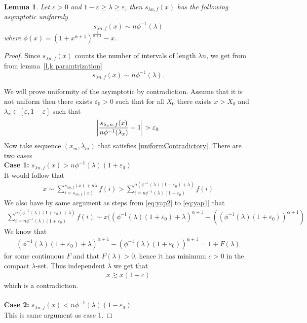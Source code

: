 \documentclass[10pt]{article}
\theoremstyle{plain}
\newtheorem{lemma}{Lemma}
\theoremstyle{definition}
\let\epsilon\varepsilon
\begin{document}
	\begin{lemma}\label{s asymp}
		Let $\epsilon>0$ and $1-\epsilon\geq\lambda\geq\epsilon$, then $s_{\lambda n, f}(x)$ has the following asymptotic uniformly
		\begin{equation}
			s_{\lambda n, f}(x)\sim n\phi^{-1}\left(\lambda\right)
		\end{equation}
		where $\phi(x)=(1+x^{\alpha+1})^{\frac{1}{\alpha+1}}-x$.
	\end{lemma}
	
	\begin{proof}
		Since $s_{\lambda n, f}(x)$ counts the number of intervals of length $\lambda n$, we get from from lemma~\ref{l,k paramtrization}
		\begin{equation}
			s_{\lambda n, f}(x) \sim n\phi^{-1}(\lambda).
		\end{equation}
		
		
		We will prove uniformity of the asymptotic by contradiction. Assume that it is not uniform then there exists $\epsilon_0>0$ such that for all $X_0$ there exists $x>X_0$ and $\lambda_x\in[\epsilon,1-\epsilon]$ such that 
		\begin{align}\label{uniformContradictory}
			\abs{\frac{s_{\lambda_x n, f}(x)}{n\phi^{-1}(\lambda_x)}-1}>\epsilon_0
		\end{align}
		Now take sequence $(x_m, \lambda_m)$ that satisfies \ref{uniformContradictory}. There are two cases\\
		\textbf{Case 1:} $s_{\lambda n, f}(x)>n\phi^{-1}(\lambda)(1+\epsilon_0)$\\
		It would follow that
		\begin{align}
			x\sim \sum_{i=s_{\lambda n, f}(x)}^{s_{\lambda n, f}(x)+n\lambda} f(i)>\sum_{i=n\phi^{-1}(\lambda)(1+\epsilon_0)}^{n(\phi^{-1}(\lambda)(1+\epsilon_0)+\lambda)} f(i)
		\end{align}
		We also have by same argument as steps from \ref{eq:yap2} to \ref{eq:yap1} that
		\begin{align}
			\sum_{i=n\phi^{-1}(\lambda)(1+\epsilon_0)}^{n(\phi^{-1}(\lambda)(1+\epsilon_0)+\lambda)} f(i)\sim x((\phi^{-1}(\lambda)(1+\epsilon_0)+\lambda)^{\alpha+1}-((\phi^{-1}(\lambda)(1+\epsilon_0))^{\alpha+1})
		\end{align}
		We know that 
		\begin{align}
			\left(\phi^{-1}(\lambda)(1+\epsilon_0)+\lambda\right)^{\alpha+1}-\left(\phi^{-1}(\lambda)(1+\epsilon_0)\right)^{\alpha+1}=1+F(\lambda)
		\end{align}
		for some continuous $F$ and that $F(\lambda)>0$, hence it has minimum $c>0$ in the compact $\lambda$-set. Thus independent $\lambda$ we get that
		\begin{align}
			x\gtrsim x(1+c)
		\end{align}
		which is a contradiction.
		\\
		\\
		\textbf{Case 2:} $s_{\lambda n, f}(x)<n\phi^{-1}(\lambda)(1-\epsilon_0)$\\
		This is same argument as case 1.
	\end{proof}
	
\end{document}
